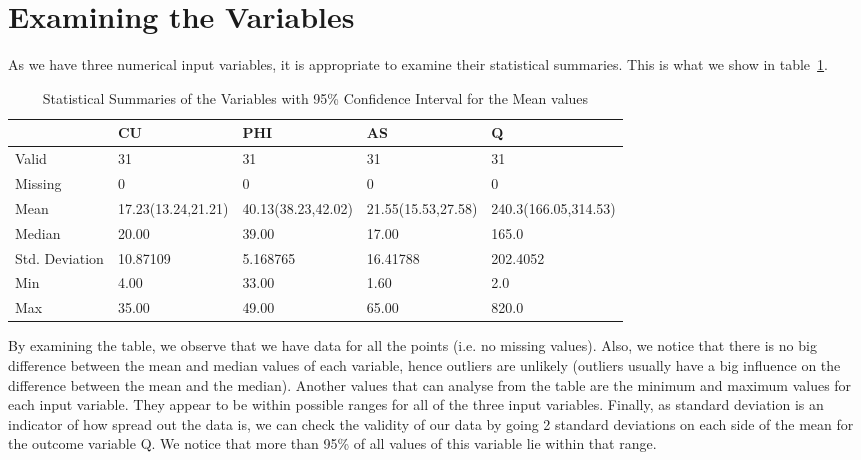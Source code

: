 \documentclass[a4paper,12pt, english]{article}
\begin{document}
\section{Examining the Variables}
As we have three numerical input variables, it is appropriate to examine their statistical summaries. This is what we show in table~\ref{table:stats-summaries}.
\begin{table}[!htbp]
\begin{center}
    \begin{tabular}{ | p{3cm} | p{2.5cm} | p{2.5cm} | p{2.5cm} | p{2.5cm} |}
    \hline
     & CU & PHI & AS & Q\\ \hline
    Valid & 31 & 31 & 31 & 31\\ \hline  
    Missing & 0 & 0 & 0 & 0\\ \hline  
    Mean   & 17.23\tiny{(13.24,21.21)}   & 40.13\tiny{(38.23,42.02)}   & 21.55\tiny{(15.53,27.58)} & 240.3\tiny{(166.05,314.53)} \\ \hline  
    Median & 20.00  & 39.00 & 17.00 & 165.0 \\ \hline
    Std. Deviation & 10.87109 & 5.168765 & 16.41788 & 202.4052\\ \hline  
    Min & 4.00 & 33.00 & 1.60 & 2.0\\ \hline  
    Max & 35.00 & 49.00 & 65.00 & 820.0  \\ \hline     
    \end{tabular}
\end{center}
\caption{Statistical Summaries of the Variables with 95\% Confidence Interval for the Mean values}
\label{table:stats-summaries}
\end{table}

By examining the table, we observe that we have data for all the points (i.e. no missing values). Also, we notice that there is no big difference between the mean and median values of each variable, hence outliers are unlikely (outliers usually have a big influence on the difference between the mean and the median). Another values that can analyse from the table are the minimum and maximum values for each input variable. They appear to be within possible ranges for all of the three input variables. Finally, as standard deviation is an indicator of how spread out the data is, we can check the validity of our data by going 2 standard deviations on each side of the mean for the outcome variable Q. We notice that more than 95\% of all values of this variable lie within that range.
\end{document}
